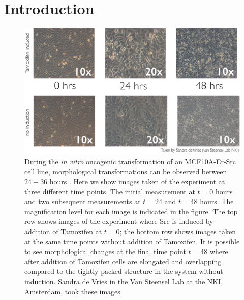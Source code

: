 
\section{Introduction}
\label{sec:introduction-mcf10}


\begin{figure}
  \centering
  \includegraphics[width=1\textwidth]{pics/mcf10a-experiment}
  \caption{
  During the {\it in vitro} oncogenic transformation of an MCF10A-Er-Src cell line, morphological transformations can be observed between $24-36$ hours \citep{Hirsch:2010ec}. Here we show images taken of the experiment at three different time points. The initial measurement at $t=0$ hours and two subsequent measurements at $t=24$ and $t=48$ hours. The magnification level for each image is indicated in the figure. The top row shows images of the experiment where Src is induced by addition of Tamoxifen at $t=0$; the bottom row shows images taken at the same time points without addition of Tamoxifen. It is possible to see morphological changes at the final time point $t=48$ where after addition of Tamoxifen cells are elongated and overlapping compared to the tightly packed structure in the system without induction. Sandra de Vries in the Van Steensel Lab at the NKI, Amsterdam, took these images. %
  }
  \label{fig:exp-pics}
\end{figure}

